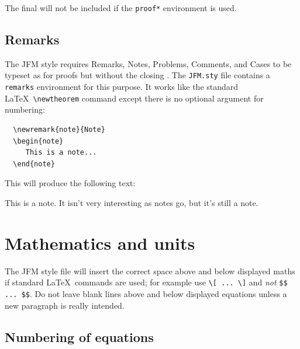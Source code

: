 The final \usebox{\proofbox} will not be included if the \verb"proof*" environment is
used.


\subsection{Remarks}

The JFM style requires Remarks, Notes, Problems, Comments, and Cases to be
typeset as for proofs but without the closing \usebox{\proofbox}.  The
\verb"JFM.sty" file contains a \verb"remarks" environment for this purpose.
It works like the standard \LaTeX\ \verb"\newtheorem" command except there
is no optional argument for numbering:

\smallskip
\begin{verbatim}
  \newremark{note}{Note}
  \begin{note}
     This is a note...
  \end{note}
\end{verbatim}
\smallskip

\noindent This will produce the following text:
\begin{note}
This is a note.  It isn't very interesting as notes go, but it's still
a note.
\end{note}

\section{Mathematics and units}

The JFM style file will insert the correct space above and below
displayed maths if standard \LaTeX\ commands are used; for example use
\verb"\[ ... \]" and {\em not\/} \verb"$$ ... $$". Do not leave blank
lines above and below displayed equations unless a new paragraph is
really intended.

\subsection{Numbering of equations}

